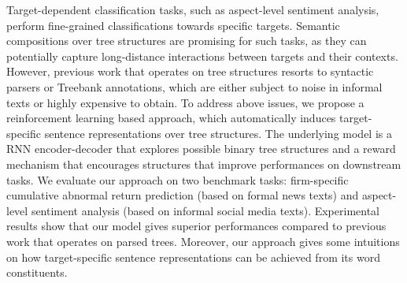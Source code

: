 Target-dependent classification tasks, such as aspect-level sentiment analysis, perform fine-grained classifications towards specific targets. Semantic compositions over tree structures are promising for such tasks, as they can potentially capture long-distance interactions between targets and their contexts. However, previous work that operates on tree structures resorts to syntactic parsers or Treebank annotations, which are either subject to noise in informal texts or highly expensive to obtain. To address above issues, we propose a reinforcement learning based approach,  which automatically induces target-specific sentence representations over tree structures. The underlying model is a RNN encoder-decoder that explores possible binary tree structures and a reward mechanism that encourages structures that improve performances on downstream tasks. We evaluate our approach on two benchmark tasks: firm-specific cumulative abnormal return prediction (based on formal news texts) and aspect-level sentiment analysis (based on informal social media texts). Experimental results show that our model gives superior performances compared to previous work that operates on parsed trees. Moreover, our approach gives some intuitions on how target-specific sentence representations can be achieved from its word constituents.
